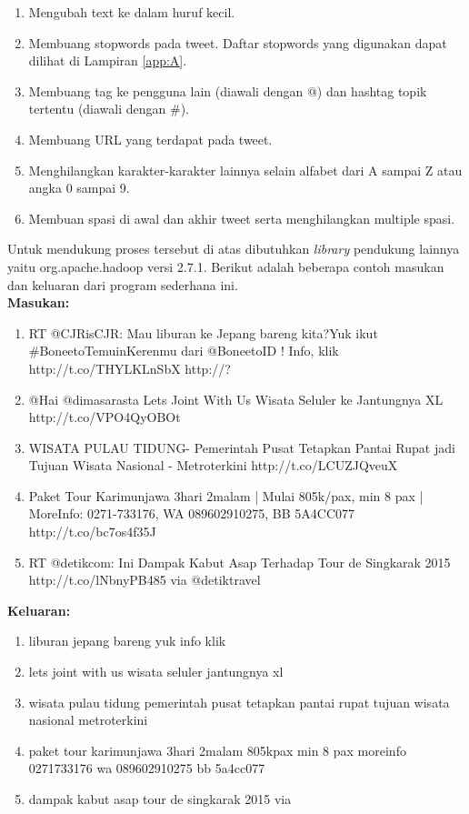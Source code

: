\begin{enumerate}
	\item Mengubah text ke dalam huruf kecil.
	\item Membuang stopwords pada tweet. Daftar stopwords yang digunakan dapat dilihat di Lampiran \ref{app:A}.
	\item Membuang tag ke pengguna lain (diawali dengan @) dan hashtag topik tertentu (diawali dengan \#).
	\item Membuang URL yang terdapat pada tweet.
	\item Menghilangkan karakter-karakter lainnya selain alfabet dari A sampai Z atau angka 0 sampai 9.
	\item Membuan spasi di awal dan akhir tweet serta menghilangkan multiple spasi.
\end{enumerate}
 
Untuk mendukung proses tersebut di atas dibutuhkan \textit{library} pendukung lainnya yaitu org.apache.hadoop versi 2.7.1. Berikut adalah beberapa contoh masukan dan keluaran dari program sederhana ini.\\
 
     
\textbf{Masukan:}
\begin{enumerate}
	\item RT @CJRisCJR: Mau liburan ke Jepang bareng kita?Yuk ikut \#BoneetoTemuinKerenmu dari @BoneetoID ! Info, klik  http://t.co/THYLKLnSbX http://?
	\item @Hai @dimasarasta  Lets Joint With Us Wisata Seluler ke Jantungnya XL http://t.co/VPO4QyOBOt
	\item WISATA PULAU TIDUNG- Pemerintah Pusat Tetapkan Pantai Rupat jadi Tujuan Wisata Nasional - Metroterkini  http://t.co/LCUZJQveuX
	\item Paket Tour Karimunjawa 3hari 2malam | Mulai 805k/pax, min 8 pax | MoreInfo: 0271-733176, WA 089602910275, BB 5A4CC077 http://t.co/bc7os4f35J
	\item RT @detikcom: Ini Dampak Kabut Asap Terhadap Tour de Singkarak 2015 http://t.co/lNbnyPB485  via @detiktravel
\end{enumerate} 
     
\textbf{Keluaran:}
\begin{enumerate}
	\item liburan jepang bareng yuk info klik 
	\item lets joint with us wisata seluler jantungnya xl
	\item wisata pulau tidung pemerintah pusat tetapkan pantai rupat tujuan wisata nasional metroterkini
	\item paket tour karimunjawa 3hari 2malam 805kpax min 8 pax moreinfo 0271733176 wa 089602910275 bb 5a4cc077
	\item dampak kabut asap tour de singkarak 2015 via
\end{enumerate}

